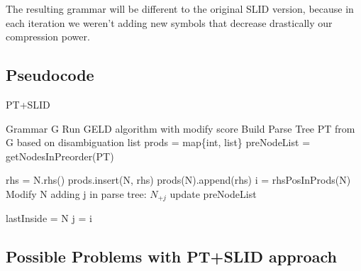 	The resulting grammar will be different to the original SLID version, because
	in each iteration we weren't adding new symbols that decrease drastically our
	compression power. \\



	\newpage

	\subsection{Pseudocode}

	\begin{algorithm}
	\caption{PT+SLID}
	\begin{algorithmic}[1]
	\REQUIRE Grammar G
	\STATE Run GELD algorithm with modify score
	\STATE Build Parse Tree PT from G based on disambiguation list
	\STATE prods = map\{int, list\} 
	\STATE preNodeList = getNodesInPreorder(PT)

		\STATE rhs = N.rhs()
			\STATE prods.insert(N, rhs)
		\ENDIF
			\STATE prods(N).append(rhs)
			\STATE i = rhsPosInProds(N)
		\ENDIF
			\STATE Modify N adding j in parse tree: $N_{+j}$
			\STATE update preNodeList
		\ENDIF

			\STATE lastInside = N
			\STATE j = i
		\ENDIF

	\ENDFOR	

	\end{algorithmic}
	\end{algorithm}

	\subsection{Possible Problems with PT+SLID approach}

